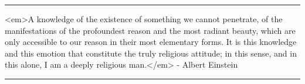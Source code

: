 \par\noindent\rule{\textwidth}{0.4pt}
<em>A knowledge of the existence of something we cannot penetrate, of the 
manifestations of the profoundest reason and the most radiant beauty, 
which are only accessible to our reason in their most elementary forms.
It is this knowledge and this emotion that constitute the truly religious
attitude; in this sense, and in this alone, I am a deeply religious man.</em>
- Albert Einstein


\par\noindent\rule{\textwidth}{0.4pt}

